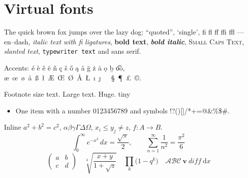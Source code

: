 \documentclass{article}\usepackage[T1]{fontenc}\usepackage{mathptmx}
\begin{document}
\section{Virtual fonts}
The quick brown fox jumps over the lazy dog: ``quoted'', `single', fi fl ff ffi ffl --- en--dash,
\textit{italic text with fi ligatures}, \textbf{bold text}, \textbf{\textit{bold italic}},
\textsc{Small Caps Text}, \textsl{slanted text}, \texttt{typewriter text} and \textsf{sans serif}.

Accents: \'e \`e \^e \"e \~n \c{c} \v{s} \H{o} \k{a} \r{a} \u{g} \.z \=a \d{o} \b{b} \t{oo},
\ae\ \oe\ \o\ \aa\ \ss\ \l\ \AE\ \OE\ \O\ \AA\ \L\ \i\ \j\ \dag\ \ddag\ \S\ \P\ \pounds\ \copyright.

{\footnotesize Footnote size text.} {\Large Large text.} {\Huge Huge.} {\tiny tiny}

\begin{itemize}\item One item with a number 0123456789 and symbols !?()[]/*+=@\&\%\$\#.\end{itemize}

Inline $a^2+b^2=c^2$, $\alpha\beta\gamma\Gamma\Delta\Omega$, $x_i \le y_j \ne z$, $f\colon A\to B$.
\[ \int_0^\infty e^{-x^2}\,dx = \frac{\sqrt{\pi}}{2}, \qquad \sum_{n=1}^{\infty}\frac{1}{n^2}=\frac{\pi^2}{6} \]
\[ \left(\begin{array}{cc} a & b\\ c & d\end{array}\right)\quad \sqrt[3]{\frac{x+y}{1+\sqrt{z}}}\quad \prod_{k}\bigl(1-q^k\bigr) \quad \mathcal{ABC}\ \mathbf{v}\ \mathit{diff}\ \mathrm{d}x \]
\end{document}
